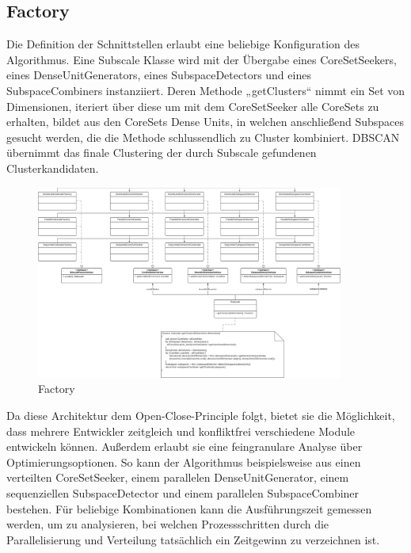\subsection{Factory}
Die Definition der Schnittstellen erlaubt eine beliebige Konfiguration des Algorithmus. Eine Subscale Klasse wird mit
der Übergabe eines CoreSetSeekers, eines DenseUnitGenerators, eines SubspaceDetectors und eines SubspaceCombiners
instanziiert. Deren Methode „getClusters“ nimmt ein Set von Dimensionen, iteriert über diese um mit dem CoreSetSeeker
alle CoreSets zu erhalten, bildet aus den CoreSets Dense Units, in welchen anschließend Subspaces gesucht werden, die
die Methode schlussendlich zu Cluster kombiniert. DBSCAN übernimmt das finale Clustering der durch Subscale gefundenen
Clusterkandidaten.
\begin{figure}[h]
	\centering
	\includegraphics[width=0.9\textwidth]{./Bilder/Restrukturierung/Factory.png}
	\caption{Factory}
\end{figure}
Da diese Architektur dem Open-Close-Principle folgt, bietet sie die Möglichkeit, dass mehrere Entwickler zeitgleich und
konfliktfrei verschiedene Module entwickeln können. Außerdem erlaubt sie eine feingranulare Analyse über
Optimierungsoptionen. So kann der Algorithmus beispielsweise aus einen verteilten CoreSetSeeker, einem parallelen
DenseUnitGenerator, einem sequenziellen SubspaceDetector und einem parallelen SubspaceCombiner bestehen. Für beliebige
Kombinationen kann die Ausführungszeit gemessen werden, um zu analysieren, bei welchen Prozessschritten durch die
Parallelisierung und Verteilung tatsächlich ein Zeitgewinn zu verzeichnen ist.

